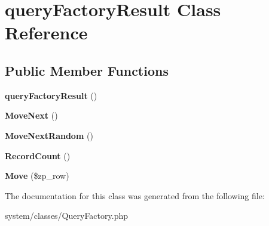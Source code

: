 \hypertarget{classquery_factory_result}{
\section{queryFactoryResult Class Reference}
\label{classquery_factory_result}
}
\subsection*{Public Member Functions}
\begin{DoxyCompactItemize}
\item 
\hypertarget{classquery_factory_result_ab909d82a92669894afcc0991ea2df6da}{
{\bfseries queryFactoryResult} ()}
\label{classquery_factory_result_ab909d82a92669894afcc0991ea2df6da}

\item 
\hypertarget{classquery_factory_result_af5dd8aa9022042948cf89bccd867b2c1}{
{\bfseries MoveNext} ()}
\label{classquery_factory_result_af5dd8aa9022042948cf89bccd867b2c1}

\item 
\hypertarget{classquery_factory_result_afa8bdde74737b9a5a205246882f6385e}{
{\bfseries MoveNextRandom} ()}
\label{classquery_factory_result_afa8bdde74737b9a5a205246882f6385e}

\item 
\hypertarget{classquery_factory_result_a01c8829d8699c5d74888d6f9c0d3a58c}{
{\bfseries RecordCount} ()}
\label{classquery_factory_result_a01c8829d8699c5d74888d6f9c0d3a58c}

\item 
\hypertarget{classquery_factory_result_a0a75c732291b4f06400d71fbca1505fa}{
{\bfseries Move} (\$zp\_\-row)}
\label{classquery_factory_result_a0a75c732291b4f06400d71fbca1505fa}

\end{DoxyCompactItemize}


The documentation for this class was generated from the following file:\begin{DoxyCompactItemize}
\item 
system/classes/QueryFactory.php\end{DoxyCompactItemize}
